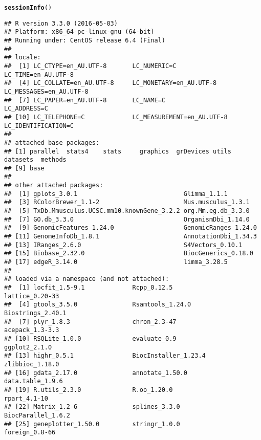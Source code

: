 \documentclass[10pt,a4paper]{extarticle}\usepackage[]{graphicx}\usepackage[]{color}
\makeatletter
\newcommand{\hlstd}[1]{\textcolor[rgb]{0.345,0.345,0.345}{#1}}%
\newcommand{\hlkwd}[1]{\textcolor[rgb]{0.737,0.353,0.396}{\textbf{#1}}}%
\newenvironment{kframe}{%
 \def\at@end@of@kframe{}%
 \ifinner\ifhmode%
  \def\at@end@of@kframe{\end{minipage}}%
  \begin{minipage}{\columnwidth}%
 \fi\fi%
 \def\FrameCommand##1{\hskip\@totalleftmargin \hskip-\fboxsep
 \colorbox{shadecolor}{##1}\hskip-\fboxsep
     \hskip-\linewidth \hskip-\@totalleftmargin \hskip\columnwidth}%
 \MakeFramed {\advance\hsize-\width
   \@totalleftmargin\z@ \linewidth\hsize
   \@setminipage}}%
 {\par\unskip\endMakeFramed%
 \at@end@of@kframe}
\newenvironment{knitrout}{}{} %
\makeatother
\begin{document}
\begin{knitrout}
\color{fgcolor}\begin{kframe}
\begin{alltt}
\hlkwd{sessionInfo}\hlstd{()}
\end{alltt}
\begin{verbatim}
## R version 3.3.0 (2016-05-03)
## Platform: x86_64-pc-linux-gnu (64-bit)
## Running under: CentOS release 6.4 (Final)
## 
## locale:
##  [1] LC_CTYPE=en_AU.UTF-8       LC_NUMERIC=C               LC_TIME=en_AU.UTF-8       
##  [4] LC_COLLATE=en_AU.UTF-8     LC_MONETARY=en_AU.UTF-8    LC_MESSAGES=en_AU.UTF-8   
##  [7] LC_PAPER=en_AU.UTF-8       LC_NAME=C                  LC_ADDRESS=C              
## [10] LC_TELEPHONE=C             LC_MEASUREMENT=en_AU.UTF-8 LC_IDENTIFICATION=C       
## 
## attached base packages:
## [1] parallel  stats4    stats     graphics  grDevices utils     datasets  methods  
## [9] base     
## 
## other attached packages:
##  [1] gplots_3.0.1                             Glimma_1.1.1                            
##  [3] RColorBrewer_1.1-2                       Mus.musculus_1.3.1                      
##  [5] TxDb.Mmusculus.UCSC.mm10.knownGene_3.2.2 org.Mm.eg.db_3.3.0                      
##  [7] GO.db_3.3.0                              OrganismDbi_1.14.0                      
##  [9] GenomicFeatures_1.24.0                   GenomicRanges_1.24.0                    
## [11] GenomeInfoDb_1.8.1                       AnnotationDbi_1.34.3                    
## [13] IRanges_2.6.0                            S4Vectors_0.10.1                        
## [15] Biobase_2.32.0                           BiocGenerics_0.18.0                     
## [17] edgeR_3.14.0                             limma_3.28.5                            
## 
## loaded via a namespace (and not attached):
##  [1] locfit_1.5-9.1             Rcpp_0.12.5                lattice_0.20-33           
##  [4] gtools_3.5.0               Rsamtools_1.24.0           Biostrings_2.40.1         
##  [7] plyr_1.8.3                 chron_2.3-47               acepack_1.3-3.3           
## [10] RSQLite_1.0.0              evaluate_0.9               ggplot2_2.1.0             
## [13] highr_0.5.1                BiocInstaller_1.23.4       zlibbioc_1.18.0           
## [16] gdata_2.17.0               annotate_1.50.0            data.table_1.9.6          
## [19] R.utils_2.3.0              R.oo_1.20.0                rpart_4.1-10              
## [22] Matrix_1.2-6               splines_3.3.0              BiocParallel_1.6.2        
## [25] geneplotter_1.50.0         stringr_1.0.0              foreign_0.8-66            

\end{verbatim}
\end{kframe}
\end{knitrout}
\end{document}
